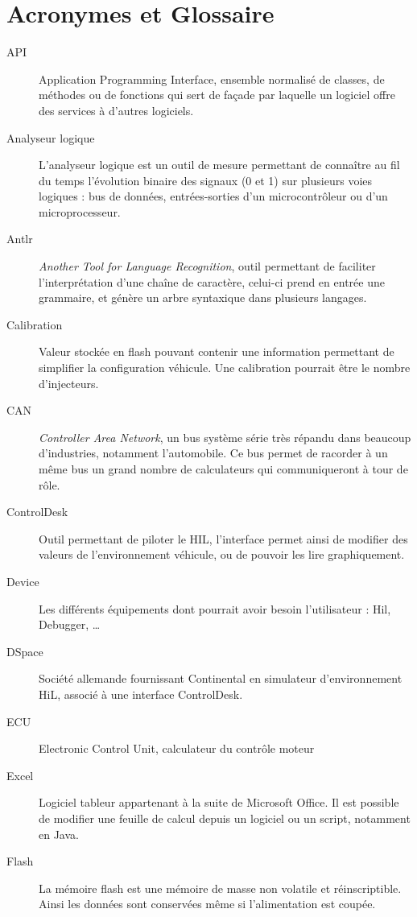 \chapter{Acronymes et Glossaire}\label{glo}
\begin{description}
\item[API] Application Programming Interface, ensemble normalisé de classes, de méthodes ou de fonctions qui sert de façade par laquelle un
	logiciel offre des services à d'autres logiciels.
	\item[Analyseur logique] L'analyseur logique est un outil de mesure permettant de connaître au fil du temps l'évolution binaire des signaux (0 et 1) sur plusieurs voies logiques : bus de données, entrées-sorties d'un microcontrôleur ou d'un microprocesseur.
\item[Antlr] \textit{Another Tool for Language Recognition}, outil permettant de faciliter l'interprétation d'une chaîne de caractère, celui-ci prend en entrée une
	grammaire, et génère un arbre syntaxique dans plusieurs langages.
\item[Calibration] Valeur stockée en flash pouvant contenir une information permettant de simplifier la configuration véhicule. Une
	calibration pourrait être le nombre d'injecteurs.
\item[CAN] \textit{Controller Area Network}, un bus système série très répandu dans beaucoup d'industries, notamment l'automobile. Ce bus permet de racorder à un même bus un grand nombre de calculateurs qui communiqueront à tour de rôle.
\item[ControlDesk] Outil permettant de piloter le HIL, l'interface permet ainsi de modifier des valeurs de l'environnement véhicule, ou de
	pouvoir les lire graphiquement.
\item[Device] Les différents équipements dont pourrait avoir besoin l'utilisateur : Hil, Debugger, \ldots 
\item[DSpace] Société allemande fournissant Continental en simulateur d'environnement HiL, associé à une interface ControlDesk.
\item[ECU] Electronic Control Unit, calculateur du contrôle moteur
\item[Excel] Logiciel tableur appartenant à la suite de Microsoft Office\textregistered. Il est possible de modifier une feuille de calcul depuis un logiciel ou un script, notamment en Java. 
\item[Flash] La mémoire flash est une mémoire de masse non volatile et réinscriptible. Ainsi les données sont conservées même si l'alimentation est coupée.

\end{description}
